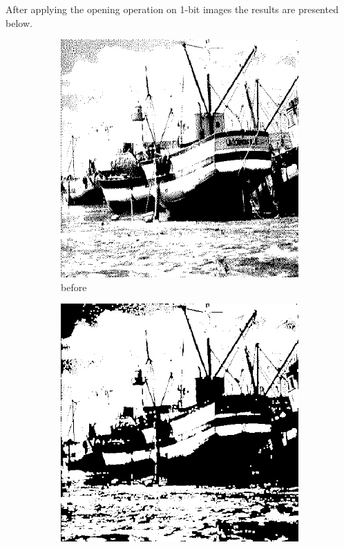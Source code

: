 \documentclass[12pt]{article}
\renewcommand{\subfiguresize}{.25\textwidth}
\begin{document}
After applying the opening operation on 1-bit images the results are presented below.

\begin{figure}[H]\centering
    \begin{subfigure}[t]{\subfiguresize}\centering
        \includegraphics[width=\textwidth]{img/magda/boatbw.png}
        \caption{before}
    \end{subfigure}
    \hspace{2em}
    \begin{subfigure}[t]{\subfiguresize}\centering
         \includegraphics[width=\textwidth]{img/magda/output1.png}

\end{subfigure}
\end{figure}
\end{document}
